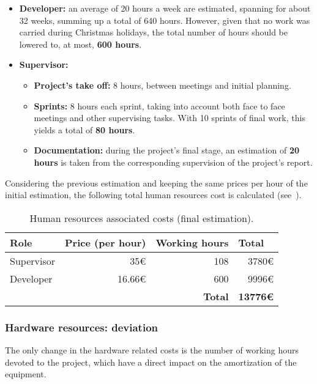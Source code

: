 \begin{itemize}
	\item \textbf{Developer:} an average of 20 hours a week are estimated, spanning for about 32 weeks, summing up a total of 640 hours. However, given that no work was carried during Christmas holidays, the total number of hours should be lowered to, at most, \textbf{600 hours}.
	\item \textbf{Supervisor:}
	\begin{itemize}
		\item \textbf{Project’s take off:} 8 hours, between meetings and initial planning.
		\item \textbf{Sprints:} 8 hours each sprint, taking into account both face to face meetings and other supervising tasks. With 10 sprints of final work, this yields a total of \textbf{80 hours}.
		\item \textbf{Documentation:} during the project’s final stage, an estimation of \textbf{20 hours} is taken from the corresponding supervision of the project’s report.
	\end{itemize}
\end{itemize}

Considering the previous estimation and keeping the same prices per hour of the initial estimation, the following total human resources cost is calculated (see~).

\begin{table}[h]
	\centering
	\begin{tabular}{lllr}
		\hline
		\textbf{Role} & \textbf{Price (per hour)} & \textbf{Working  hours} & \multicolumn{1}{l}{\textbf{Total}} \\ \hline
		Supervisor & \multicolumn{1}{r}{35€} & \multicolumn{1}{r}{108} & 3780€ \\
		Developer & \multicolumn{1}{r}{16.66€} & \multicolumn{1}{r}{600} & 9996€ \\ \hline
		&  & \multicolumn{1}{r}{\textbf{Total}} & \textbf{13776€}
	\end{tabular}
	\caption[Final estimation: human resources costs.]{Human resources associated costs (final estimation).}
	\label{table:human-resources-final}
\end{table}

\subsubsection*{Hardware resources: deviation}

The only change in the hardware related costs is the number of working hours devoted to the project, which have a direct impact on the amortization of the equipment.

